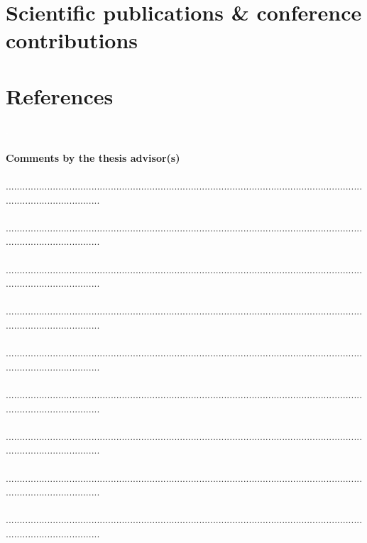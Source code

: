\documentclass[11pt,titlepage]{article}
\begin{document}
\section{Scientific publications \& conference contributions}

\nocite{Wicaksono2014a}
\nocite{Wicaksono2014b}
\nocite{Wicaksono2014c}
\nocite{Wicaksono2015a}
\nocite{Wicaksono2015b}
\nocite{Wicaksono2015c}

\printbibliography[heading=none]

\section{References}

\printbibliography[heading=none]

\newpage
\textcolor{white}.\\\\
\noindent \textbf{Comments by the thesis advisor(s)}\\\\
...................................................................................................................................................................\\\\
...................................................................................................................................................................\\\\
...................................................................................................................................................................\\\\
...................................................................................................................................................................\\\\
...................................................................................................................................................................\\\\
...................................................................................................................................................................\\\\
...................................................................................................................................................................\\\\
...................................................................................................................................................................\\\\
...................................................................................................................................................................\\\\
\end{document}
